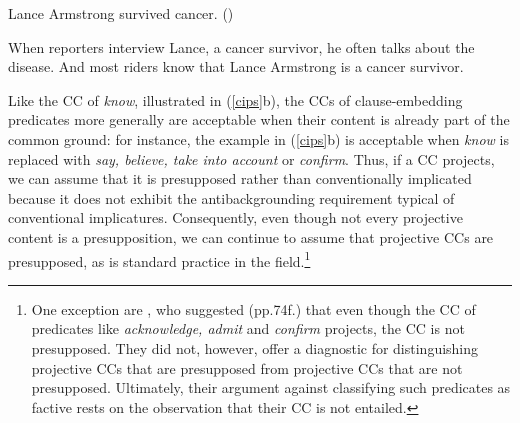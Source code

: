 \documentclass[11pt,fleqn]{article}
\def\infelic{{\leavevmode\llap{\#}}}
\newcommand{\6}{\mbox{$[\hspace*{-.6mm}[$}}
\newcommand{\9}{\mbox{$]\hspace*{-.6mm}]$}}
\begin{document}
\begin{exe}
\ex\label{cips} Lance Armstrong survived cancer. \hfill (\citealt[34]{potts05})
\begin{xlist}
\ex \infelic When reporters interview Lance, a cancer survivor, he often talks about the disease.
\ex And most riders know that Lance Armstrong is a cancer survivor.  
\end{xlist}
\end{exe}
Like the CC of {\em know}, illustrated in (\ref{cips}b), the CCs of clause-embedding predicates more generally are acceptable when their content is already part of the common ground: for instance, the example in (\ref{cips}b) is acceptable when {\em know} is replaced with {\em say, believe, take into account} or {\em confirm}. Thus, if a CC projects, we can assume that it is presupposed rather than conventionally implicated because it does not exhibit the antibackgrounding requirement typical of conventional implicatures. Consequently, even though not every projective content is a presupposition, we can continue to assume that projective CCs are presupposed, as is standard practice in the field.\footnote{One exception are \citet{anand-hacquard2014}, who suggested (pp.74f.) that even though the CC of predicates like {\em acknowledge, admit} and {\em confirm} projects, the CC is not presupposed. They did not, however, offer a diagnostic for distinguishing projective CCs that are presupposed from projective CCs that are not presupposed. Ultimately, their argument against classifying such predicates as factive rests on the observation that their CC is not entailed.}  


\end{document}

